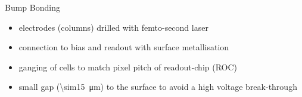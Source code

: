 \begin{frame}{Bump Bonding}

	
	\begin{itemize}\itemfill
		\item electrodes (columns) drilled with femto-second laser
		\item connection to bias and readout with surface metallisation
		\item ganging of cells to match pixel pitch of readout-chip (ROC)
		\item small gap (\SI{\sim15}{\micro\meter}) to the surface to avoid a high voltage break-through 
	\end{itemize}

\end{frame}
